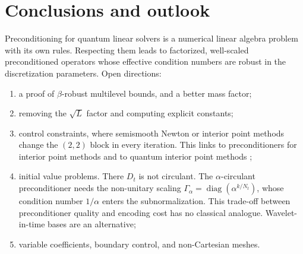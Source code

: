 \documentclass[11pt,a4paper]{article}
\theoremstyle{remark}
\begin{document}
\section{Conclusions and outlook}\label{sec:conclusions}

Preconditioning for quantum linear solvers is a numerical linear algebra
problem with its own rules. Respecting them leads to factorized,
well-scaled preconditioned operators whose effective condition numbers
are robust in the discretization parameters. Open directions:
\begin{enumerate}
\item a proof of $\beta$-robust multilevel bounds, and a better mass factor;
\item removing the $\sqrt L$ factor and computing explicit constants;
\item control constraints, where semismooth Newton or interior point
  methods change the $(2,2)$ block in every iteration. This links to
  preconditioners for interior point methods and to quantum interior point
  methods \cite{QIPMreview};
\item initial value problems. There $D_t$ is not circulant. The
  $\alpha$-circulant preconditioner \cite{MPW18} needs the non-unitary scaling
  $\Gamma_\alpha=\operatorname{diag}(\alpha^{k/N_t})$, whose condition number $1/\alpha$ enters the
  subnormalization. This trade-off between preconditioner quality and
  encoding cost has no classical analogue. Wavelet-in-time bases
  \cite{SS09} are an alternative;
\item variable coefficients, boundary control, and non-Cartesian meshes.
\end{enumerate}
\end{document}
